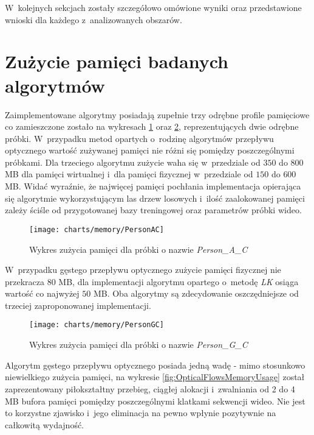    W~kolejnych sekcjach zostały szczegółowo omówione wyniki oraz przedstawione wnioski dla każdego z~analizowanych obszarów.

  \section{Zużycie pamięci badanych algorytmów}\label{Section_Memory}

    Zaimplementowane algorytmy posiadają zupełnie trzy odrębne profile pamięciowe co zamieszczone zostało na wykresach \ref{fig:MemoryUsagePersonAC} oraz \ref{fig:MemoryUsagePersonGC}, reprezentujących dwie odrębne próbki. W~przypadku metod opartych o~rodzinę algorytmów przepływu optycznego wartość zużywanej pamięci nie różni się pomiędzy poszczególnymi próbkami. Dla trzeciego algorytmu zużycie waha się w~przedziale od $350$ do $800$ MB dla pamięci wirtualnej i~dla pamięci fizycznej w~przedziale od $150$ do $600$ MB. Widać wyraźnie, że najwięcej pamięci pochłania implementacja opierająca się algorytmie wykorzystującym las drzew losowych i~ilość zaalokowanej pamięci zależy ściśle od przygotowanej bazy treningowej oraz parametrów próbki wideo.

      \begin{figure}[!ht]
        \centering
        \texttt{[image: charts/memory/PersonAC]}
        \caption[Wykres zużycia pamięci dla próbki o nazwie Person\_A\_C]
                {Wykres zużycia pamięci dla próbki o nazwie \textit{Person\_A\_C}}
        \label{fig:MemoryUsagePersonAC}
      \end{figure}

    W~przypadku gęstego przepływu optycznego zużycie pamięci fizycznej nie przekracza $80$ MB, dla implementacji algorytmu opartego o~metodę \textit{LK} osiąga wartość co najwyżej $50$ MB. Oba algorytmy są zdecydowanie oszczędniejsze od trzeciej zaproponowanej implementacji.

      \begin{figure}[!ht]
        \centering
        \texttt{[image: charts/memory/PersonGC]}
        \caption[Wykres zużycia pamięci dla próbki o nazwie Person\_G\_C]
                {Wykres zużycia pamięci dla próbki o nazwie \textit{Person\_G\_C}}
        \label{fig:MemoryUsagePersonGC}
      \end{figure}

    Algorytm gęstego przepływu optycznego posiada jedną wadę - mimo stosunkowo niewielkiego zużycia pamięci, na wykresie \ref{fig:OpticalFlowsMemoryUsage} został zaprezentowany piłokształtny przebieg, ciągłej alokacji i~zwalniania od 2 do 4 MB bufora pamięci pomiędzy poszczególnymi klatkami sekwencji wideo. Nie jest to korzystne zjawisko i~jego eliminacja na pewno wpłynie pozytywnie na całkowitą wydajność.

